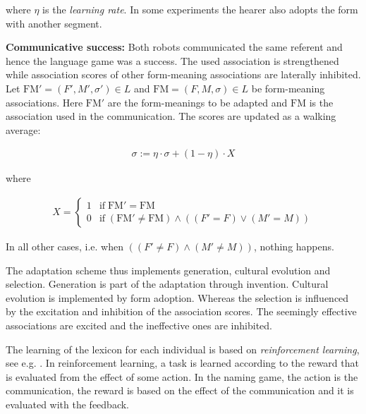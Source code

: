 \begin{description}
where $\eta$ is the {\em learning rate}. In some experiments the hearer also adopts the form with another segment.

\item {\bf Communicative success:} Both robots communicated the same referent and hence the language game was a success. The used association is strengthened while association scores of other form-meaning associations are laterally inhibited. Let $\mbox{FM}' = (F',M',\sigma') \in L$ and $\mbox{FM} = (F,M,\sigma) \in L$ be form-meaning associations. Here $\mbox{FM}'$ are the form-meanings to be adapted and $\mbox{FM}$ is the association used in the communication. The scores are updated as a walking average:

\begin{eqnarray}
\sigma := \eta \cdot \sigma + (1 - \eta) \cdot X
\label{e:cm:adapt2}
\end{eqnarray}


where

\begin{eqnarray}
X = \left \{ \begin{array}{rl} 1 & \mbox{if}\; \mbox{FM}' = \mbox{FM} \nonumber\\
0 & \mbox{if}\; (\mbox{FM}' \neq \mbox{FM}) \wedge ((F' = F) \vee (M' = M))\nonumber \end{array} \right.
\end{eqnarray}

In all other cases, i.e. when $((F' \neq F)\wedge (M' \neq M))$, nothing happens.
\end{description}

The adaptation scheme thus implements generation, cultural evolution and selection. Generation is part of the adaptation through invention. Cultural evolution is implemented by form adoption. Whereas the selection is influenced by the excitation and inhibition of the association scores. The seemingly effective associations are excited and the ineffective ones are inhibited.

The learning of the lexicon for each individual is based on {\em reinforcement learning}, see e.g. \citep{suttonbarto:1998}. In reinforcement learning, a task is learned according to the reward that is evaluated from the effect of some action. In the naming game, the action is the communication, the reward is based on the effect of the communication and it is evaluated with the feedback. 

